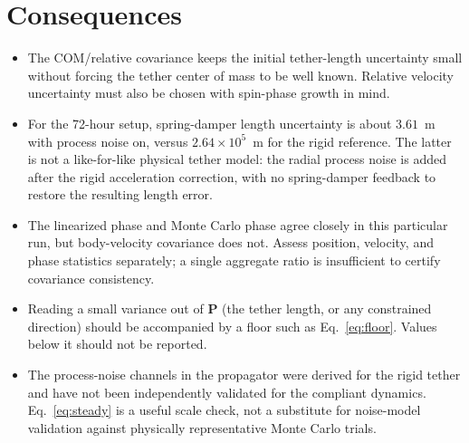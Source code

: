 \documentclass{article}
\newcommand{\Pm}{\mathbf{P}}
\begin{document}
\section{Consequences}

\begin{itemize}
  \item The COM/relative covariance keeps the initial tether-length uncertainty
    small without forcing the tether center of mass to be well known. Relative
    velocity uncertainty must also be chosen with spin-phase growth in mind.
  \item For the 72-hour setup, spring-damper length uncertainty is about
    $3.61$~m with process noise on, versus $2.64\times10^5$~m for the rigid
    reference. The latter is not a like-for-like physical tether model: the
    radial process noise is added after the rigid acceleration correction,
    with no spring-damper feedback to restore the resulting length error.
  \item The linearized phase and Monte Carlo phase agree closely in this
    particular run, but body-velocity covariance does not. Assess position,
    velocity, and phase statistics separately; a single aggregate ratio is
    insufficient to certify covariance consistency.
  \item Reading a small variance out of $\Pm$ (the tether length, or any
    constrained direction) should be accompanied by a floor such as
    Eq.~\eqref{eq:floor}. Values below it should not be reported.
  \item The process-noise channels in the propagator were derived for the rigid
    tether and have not been independently validated for the compliant
    dynamics. Eq.~\eqref{eq:steady} is a useful scale check, not a substitute
    for noise-model validation against physically representative Monte Carlo
    trials.
\end{itemize}
\end{document}
